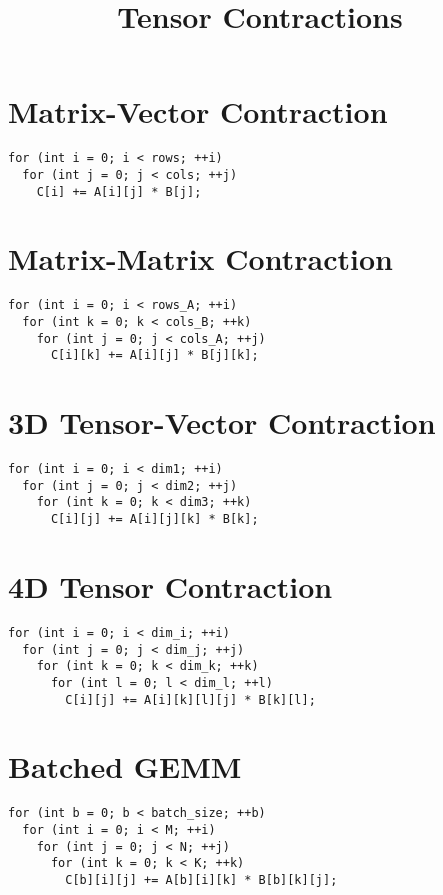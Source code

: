\documentclass[conference]{article}
\title{Tensor Contractions}
\begin{document}
\maketitle

\section{Matrix-Vector Contraction}
\begin{verbatim}
for (int i = 0; i < rows; ++i)
  for (int j = 0; j < cols; ++j)
    C[i] += A[i][j] * B[j];
\end{verbatim}

\section{Matrix-Matrix Contraction}
\begin{verbatim}
for (int i = 0; i < rows_A; ++i)
  for (int k = 0; k < cols_B; ++k)
    for (int j = 0; j < cols_A; ++j)
      C[i][k] += A[i][j] * B[j][k];
\end{verbatim}

\section{3D Tensor-Vector Contraction}
\begin{verbatim}
for (int i = 0; i < dim1; ++i)
  for (int j = 0; j < dim2; ++j)
    for (int k = 0; k < dim3; ++k)
      C[i][j] += A[i][j][k] * B[k];
\end{verbatim}

\section{4D Tensor Contraction}
\begin{verbatim}
for (int i = 0; i < dim_i; ++i)
  for (int j = 0; j < dim_j; ++j)
    for (int k = 0; k < dim_k; ++k)
      for (int l = 0; l < dim_l; ++l)
        C[i][j] += A[i][k][l][j] * B[k][l];
\end{verbatim}

\section{Batched GEMM}
\begin{verbatim}
for (int b = 0; b < batch_size; ++b)
  for (int i = 0; i < M; ++i)
    for (int j = 0; j < N; ++j)
      for (int k = 0; k < K; ++k)
        C[b][i][j] += A[b][i][k] * B[b][k][j];
\end{verbatim}
\end{document}
